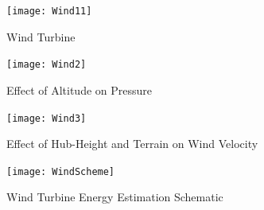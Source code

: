 \documentclass[12pt]{article}
\begin{document}
\begin{figure}[H]
\centering
\texttt{[image: Wind11]}
\caption{Wind Turbine}
\label{figc5h1} %
\end{figure}

\begin{figure}[H]
\centering
\texttt{[image: Wind2]}
\caption{Effect of Altitude on Pressure}
\label{figc5h2} %
\end{figure}

\begin{figure}[H]
\centering
\texttt{[image: Wind3]}
\caption{Effect of Hub-Height and Terrain on Wind Velocity}
\label{figc5h3} %
\end{figure}

\begin{figure}[H]
\centering
\texttt{[image: WindScheme]}
\caption{Wind Turbine Energy Estimation Schematic}
\label{figc5h4} %
\end{figure}
\end{document}
